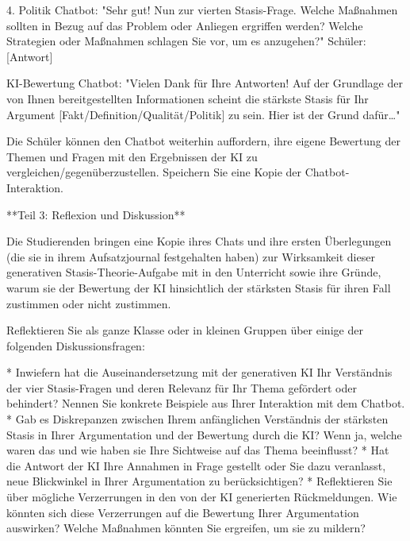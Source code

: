 \documentclass[
  ngerman,
  letterpaper,
  DIV=11]{scrreprt}
\newenvironment{Shaded}{\begin{snugshade}}{\end{snugshade}}
\newcommand{\CommentTok}[1]{\textcolor[rgb]{0.37,0.37,0.37}{#1}}
\newcommand{\NormalTok}[1]{\textcolor[rgb]{0.00,0.23,0.31}{#1}}
\newcommand{\OtherTok}[1]{\textcolor[rgb]{0.00,0.23,0.31}{#1}}
\newcommand{\SpecialStringTok}[1]{\textcolor[rgb]{0.13,0.47,0.30}{#1}}
\begin{document}
\begin{tcolorbox}
\begin{Shaded}
\begin{Highlighting}[]
\SpecialStringTok{4. }\NormalTok{Politik}
\NormalTok{Chatbot: "Sehr gut! Nun zur vierten Stasis{-}Frage. Welche Maßnahmen sollten in Bezug auf das Problem oder Anliegen ergriffen werden? Welche Strategien oder Maßnahmen schlagen Sie vor, um es anzugehen?"}
\NormalTok{Schüler: }\CommentTok{[}\OtherTok{Antwort}\CommentTok{]}

\NormalTok{KI{-}Bewertung}
\NormalTok{Chatbot: "Vielen Dank für Ihre Antworten! Auf der Grundlage der von Ihnen bereitgestellten Informationen scheint die stärkste Stasis für Ihr Argument }\CommentTok{[}\OtherTok{Fakt/Definition/Qualität/Politik}\CommentTok{]}\NormalTok{ zu sein. Hier ist der Grund dafür…"}

\NormalTok{Die Schüler können den Chatbot weiterhin auffordern, ihre eigene Bewertung der Themen und Fragen mit den Ergebnissen der KI zu vergleichen/gegenüberzustellen. Speichern Sie eine Kopie der Chatbot{-}Interaktion.}

\NormalTok{**Teil 3: Reflexion und Diskussion**}

\NormalTok{Die Studierenden bringen eine Kopie ihres Chats und ihre ersten Überlegungen (die sie in ihrem Aufsatzjournal festgehalten haben) zur Wirksamkeit dieser generativen Stasis{-}Theorie{-}Aufgabe mit in den Unterricht sowie ihre Gründe, warum sie der Bewertung der KI hinsichtlich der stärksten Stasis für ihren Fall zustimmen oder nicht zustimmen.}

\NormalTok{Reflektieren Sie als ganze Klasse oder in kleinen Gruppen über einige der folgenden Diskussionsfragen:}

\SpecialStringTok{* }\NormalTok{Inwiefern hat die Auseinandersetzung mit der generativen KI Ihr Verständnis der vier Stasis{-}Fragen und deren Relevanz für Ihr Thema gefördert oder behindert? Nennen Sie konkrete Beispiele aus Ihrer Interaktion mit dem Chatbot.}
\SpecialStringTok{* }\NormalTok{Gab es Diskrepanzen zwischen Ihrem anfänglichen Verständnis der stärksten Stasis in Ihrer Argumentation und der Bewertung durch die KI? Wenn ja, welche waren das und wie haben sie Ihre Sichtweise auf das Thema beeinflusst?}
\SpecialStringTok{* }\NormalTok{Hat die Antwort der KI Ihre Annahmen in Frage gestellt oder Sie dazu veranlasst, neue Blickwinkel in Ihrer Argumentation zu berücksichtigen?}
\SpecialStringTok{* }\NormalTok{Reflektieren Sie über mögliche Verzerrungen in den von der KI generierten Rückmeldungen. Wie könnten sich diese Verzerrungen auf die Bewertung Ihrer Argumentation auswirken? Welche Maßnahmen könnten Sie ergreifen, um sie zu mildern?}
\end{Highlighting}
\end{Shaded}

\end{tcolorbox}
\end{document}
